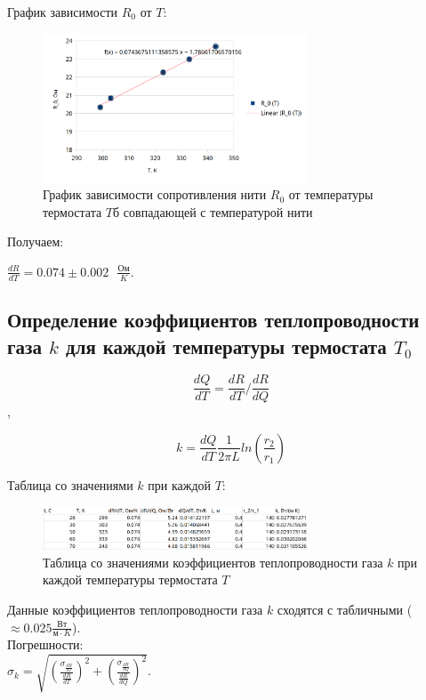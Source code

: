 \documentclass[a4paper]{article}
\begin{document}
\newpage

График зависимости $R_0$ от $T$:

\begin{figure}[ht]
    \centering
    \includegraphics[width=0.7\textwidth]{R0_T/chart_R0_T.png}
    \caption{График зависимости сопротивления нити $R_0$ от температуры термостата $T$б совпадающей с температурой нити}
\end{figure}

Получаем:

$\frac{dR}{dT} = 0.074 \pm 0.002 \text{ }\frac{\text{Ом}}{K}$.

\subsection{Определение коэффициентов теплопроводности газа $k$ для каждой температуры термостата $T_0$}

\[\frac{dQ}{dT} = \frac{dR}{dT} / \frac{dR}{dQ} \],

\[k = \frac{dQ}{dT} \frac{1}{2\pi L} ln(\frac{r_2}{r_1})\]

Таблица со значениями $k$ при каждой $T$:

\begin{figure}[ht]
    \centering
    \includegraphics[width=0.7\textwidth]{k_T/table_k_T.png}
    \caption{Таблица со значениями коэффициентов теплопроводности
газа $k$ при каждой температуры термостата $T$}
\end{figure}

Данные коэффициентов теплопроводности газа $k$ сходятся с табличными ($\approx 0.025 \frac{\text{Вт}}{\text{м} \cdot K}$). \\

Погрешности: \\

$\sigma_k = \sqrt{(\frac{\sigma_{\frac{dR}{dT}}}{\frac{dR}{dT}})^2 + (\frac{\sigma_{\frac{dR}{dQ}}}{\frac{dR}{dQ}})^2}$.\\
\end{document}
